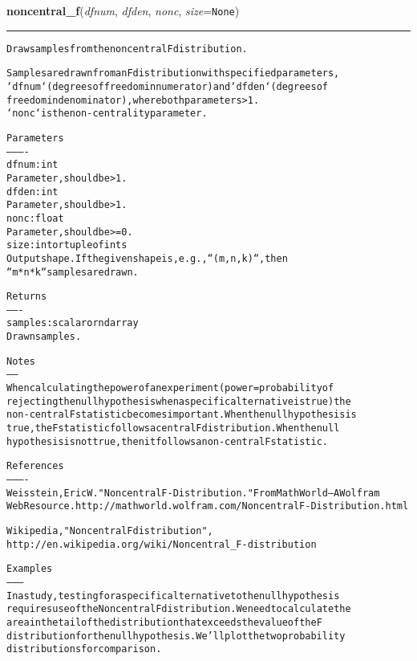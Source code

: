 \hspace{.8\funcindent}\begin{boxedminipage}{\funcwidth}

    \raggedright \textbf{noncentral\_f}(\textit{dfnum}, \textit{dfden}, \textit{nonc}, \textit{size}={\tt None})

    \vspace{-1.5ex}

    \rule{\textwidth}{0.5\fboxrule}
\setlength{\parskip}{2ex}
\begin{alltt}
Draw samples from the noncentral F distribution.

Samples are drawn from an F distribution with specified parameters,
`dfnum` (degrees of freedom in numerator) and `dfden` (degrees of
freedom in denominator), where both parameters {\textgreater} 1.
`nonc` is the non-centrality parameter.

Parameters
----------
dfnum : int
    Parameter, should be {\textgreater} 1.
dfden : int
    Parameter, should be {\textgreater} 1.
nonc : float
    Parameter, should be {\textgreater}= 0.
size : int or tuple of ints
    Output shape. If the given shape is, e.g., ``(m, n, k)``, then
    ``m * n * k`` samples are drawn.

Returns
-------
samples : scalar or ndarray
    Drawn samples.

Notes
-----
When calculating the power of an experiment (power = probability of
rejecting the null hypothesis when a specific alternative is true) the
non-central F statistic becomes important.  When the null hypothesis is
true, the F statistic follows a central F distribution. When the null
hypothesis is not true, then it follows a non-central F statistic.

References
----------
Weisstein, Eric W. "Noncentral F-Distribution." From MathWorld--A Wolfram
Web Resource.  http://mathworld.wolfram.com/NoncentralF-Distribution.html

Wikipedia, "Noncentral F distribution",
http://en.wikipedia.org/wiki/Noncentral\_F-distribution

Examples
--------
In a study, testing for a specific alternative to the null hypothesis
requires use of the Noncentral F distribution. We need to calculate the
area in the tail of the distribution that exceeds the value of the F
distribution for the null hypothesis.  We'll plot the two probability
distributions for comparison.


\end{alltt}
\end{boxedminipage}
